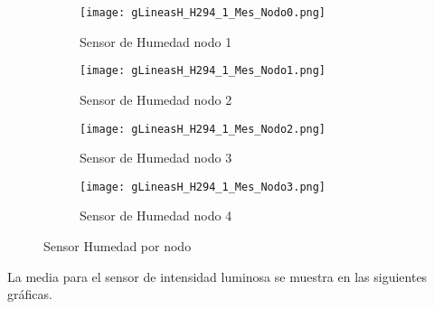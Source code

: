 \documentclass{article}
\begin{document}
        \begin{figure}[h!]
            \centering\begin{subfigure}[h]{0.42\linewidth}
                                    \texttt{[image: gLineasH\_H294\_1\_Mes\_Nodo0.png]}
                                    \caption{Sensor de Humedad nodo 1}
                                    \label{fig:Humedad1}
                                \end{subfigure}
                                \begin{subfigure}[h]{0.42\linewidth}
                                    \texttt{[image: gLineasH\_H294\_1\_Mes\_Nodo1.png]}
                                    \caption{Sensor de Humedad nodo 2}
                                    \label{fig:Humedad2}
                                \end{subfigure}
                                \begin{subfigure}[h]{0.42\linewidth}
                                    \texttt{[image: gLineasH\_H294\_1\_Mes\_Nodo2.png]}
                                    \caption{Sensor de Humedad nodo 3}
                                    \label{fig:Humedad3}
                                \end{subfigure}
                                \begin{subfigure}[h]{0.42\linewidth}
                                    \texttt{[image: gLineasH\_H294\_1\_Mes\_Nodo3.png]}
                                    \caption{Sensor de Humedad nodo 4}
                                    \label{fig:Humedad4}
                                \end{subfigure}
                                \caption{Sensor Humedad por nodo}
            \label{fig:fig2}
        \end{figure}
        \newline
        \newline La media para el sensor de intensidad luminosa se muestra en las siguientes gráficas.
\end{document}
